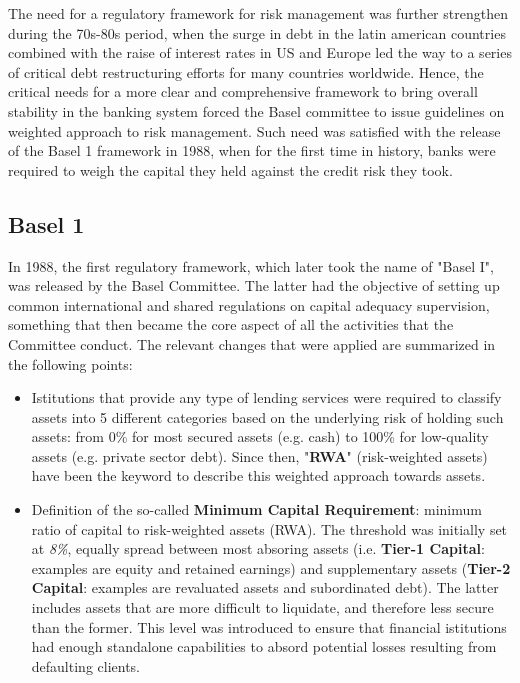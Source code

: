 \documentclass[a4paper,12pt]{article}
\begin{document}
    The need for a regulatory framework for risk management was further strengthen during the 70s-80s period, when the surge in debt in the latin american countries combined with the raise of interest rates
    in US and Europe led the way to a series of critical debt restructuring efforts for many countries worldwide. Hence, the critical needs for a more clear and comprehensive framework to bring overall 
    stability in the banking system forced the Basel committee to issue guidelines on weighted approach to risk management. Such need was satisfied with the release of the Basel 1 framework in 1988, 
    when for the first time in history, banks were required to weigh the capital they held against the credit risk they took. 
    
    \subsection[]{Basel 1}
    In 1988, the first regulatory framework, which later took the name of "Basel I", was released by the Basel Committee. 
    The latter had the objective of setting up common international and shared regulations on capital adequacy supervision, something that then became the core aspect of all the activities that the Committee conduct. 
    The relevant changes that were applied are summarized in the following points:
    
        \begin{itemize}
            \item Istitutions that provide any type of lending services were required to classify assets into 5 different categories based on the underlying risk of holding such assets: from 0\% for most secured assets (e.g. cash) to 100\% for low-quality assets (e.g. private sector debt). Since then, "\textbf{RWA}" (risk-weighted assets) have been the keyword to describe this weighted approach towards assets.
            \item Definition of the so-called \textbf{Minimum Capital Requirement}: minimum ratio of capital to risk-weighted assets (RWA). The threshold was initially set at \textit{8\%}, equally spread between most absoring assets (i.e. \textbf{Tier-1 Capital}: examples are equity and retained earnings) and supplementary assets (\textbf{Tier-2 Capital}: examples are revaluated assets and subordinated debt). The latter includes assets that are more difficult to liquidate, and therefore less secure than the former. This level was introduced to ensure that financial istitutions had enough standalone capabilities to absord potential losses resulting from defaulting clients.
        \end{itemize}
\end{document}
